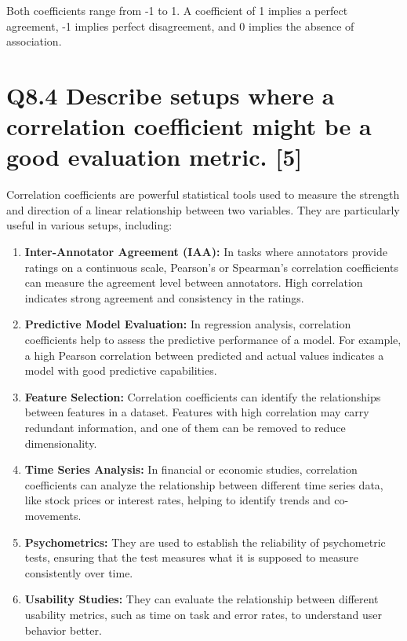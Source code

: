 \documentclass[11pt]{article}
\begin{document}
Both coefficients range from -1 to 1. A coefficient of 1 implies a perfect agreement, -1 implies perfect disagreement, and 0 implies the absence of association.

\section{Q8.4 Describe setups where a correlation coefficient might be a good evaluation metric. [5]}

Correlation coefficients are powerful statistical tools used to measure the strength and direction of a linear relationship between two variables. They are particularly useful in various setups, including:

\begin{enumerate}
  \item \textbf{Inter-Annotator Agreement (IAA):} In tasks where annotators provide ratings on a continuous scale, Pearson's or Spearman's correlation coefficients can measure the agreement level between annotators. High correlation indicates strong agreement and consistency in the ratings.

  \item \textbf{Predictive Model Evaluation:} In regression analysis, correlation coefficients help to assess the predictive performance of a model. For example, a high Pearson correlation between predicted and actual values indicates a model with good predictive capabilities.

  \item \textbf{Feature Selection:} Correlation coefficients can identify the relationships between features in a dataset. Features with high correlation may carry redundant information, and one of them can be removed to reduce dimensionality.

  \item \textbf{Time Series Analysis:} In financial or economic studies, correlation coefficients can analyze the relationship between different time series data, like stock prices or interest rates, helping to identify trends and co-movements.

  \item \textbf{Psychometrics:} They are used to establish the reliability of psychometric tests, ensuring that the test measures what it is supposed to measure consistently over time.

  \item \textbf{Usability Studies:} They can evaluate the relationship between different usability metrics, such as time on task and error rates, to understand user behavior better.
\end{enumerate}
\end{document}
